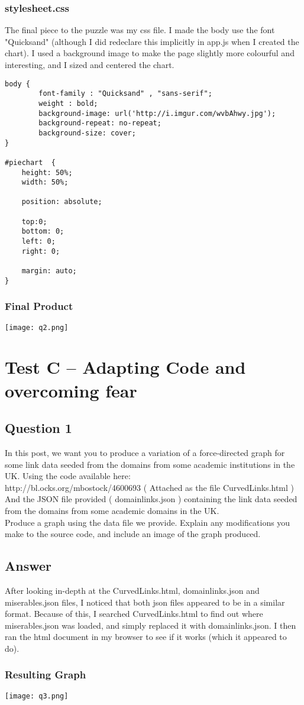 \documentclass{article}
\begin{document}
\subsubsection{stylesheet.css}
The final piece to the puzzle was my css file. I made the body use the font "Quicksand" (although I did redeclare this implicitly in app.js when I created the chart). I used a background image to make the page slightly more colourful and interesting, and I sized and centered the chart.
\begin{lstlisting}
body {  
        font-family : "Quicksand" , "sans-serif";
        weight : bold;
        background-image: url('http://i.imgur.com/wvbAhwy.jpg');
        background-repeat: no-repeat;
        background-size: cover;
}

#piechart  {
    height: 50%;
    width: 50%;

    position: absolute;

    top:0;
    bottom: 0;
    left: 0;
    right: 0;

    margin: auto;
}
\end{lstlisting}

\subsubsection{Final Product}
\texttt{[image: q2.png]}
\section{Test C – Adapting Code and overcoming fear}
\subsection{Question 1}
In this post, we want you to produce a variation of a force-directed graph for some link data seeded from the domains from some academic institutions in the UK.
Using the code available here:
\\ \newline
http://bl.ocks.org/mbostock/4600693 ( Attached as the file CurvedLinks.html )
And the JSON file provided ( domainlinks.json ) containing the link data seeded from the domains from some academic domains in the UK.
\\ \newline
Produce a graph using the data file we provide. Explain any modifications you make to the source code, and include an image of the graph produced.

\subsection{Answer}
After looking in-depth at the CurvedLinks.html, domainlinks.json and miserables.json files, I noticed that both json files appeared to be in a similar format. Because of this, I searched CurvedLinks.html to find out where miserables.json was loaded, and simply replaced it with domainlinks.json. I then ran the html document in my browser to see if it works (which it appeared to do).
\newline
\subsubsection{Resulting Graph}
\texttt{[image: q3.png]}
\end{document}
